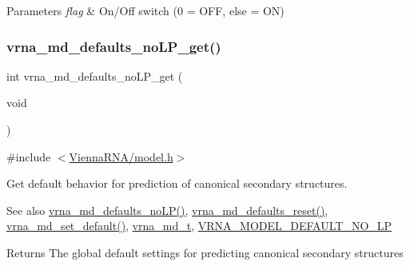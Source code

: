 \begin{DoxyParams}{Parameters}
{\em flag} & On/\+Off switch (0 = O\+FF, else = ON) \\
\hline
\end{DoxyParams}
\mbox{\label{group__model__details_ga934344888fbacaed538bbbfe910f2aa6}} 
\subsubsection{\texorpdfstring{vrna\_md\_defaults\_noLP\_get()}{vrna\_md\_defaults\_noLP\_get()}}
{\footnotesize\ttfamily int vrna\+\_\+md\+\_\+defaults\+\_\+no\+L\+P\+\_\+get (\begin{DoxyParamCaption}\item[{void}]{ }\end{DoxyParamCaption})}



{\ttfamily \#include $<$\mbox{\hyperlink{model_8h}{Vienna\+R\+N\+A/model.\+h}}$>$}



Get default behavior for prediction of canonical secondary structures. 

\begin{DoxySeeAlso}{See also}
\mbox{\hyperlink{group__model__details_ga2f88ffc393ac9d7987849c965fd29ea8}{vrna\+\_\+md\+\_\+defaults\+\_\+no\+L\+P()}}, \mbox{\hyperlink{group__model__details_ga70834424cf804d149937de89f80ceb45}{vrna\+\_\+md\+\_\+defaults\+\_\+reset()}}, \mbox{\hyperlink{group__model__details_ga8ac6ff84936282436f822644bf841f66}{vrna\+\_\+md\+\_\+set\+\_\+default()}}, \mbox{\hyperlink{group__model__details_ga1f8a10e12a0a1915f2a4eff0b28ea17c}{vrna\+\_\+md\+\_\+t}}, \mbox{\hyperlink{group__model__details_gab72462726dd60ed0d43339bbf7ee08ad}{V\+R\+N\+A\+\_\+\+M\+O\+D\+E\+L\+\_\+\+D\+E\+F\+A\+U\+L\+T\+\_\+\+N\+O\+\_\+\+LP}} 
\end{DoxySeeAlso}
\begin{DoxyReturn}{Returns}
The global default settings for predicting canonical secondary structures 
\end{DoxyReturn}
\mbox{\label{group__model__details_ga98218f85c7a957a1d1ddf4627fdf5a39}} 
